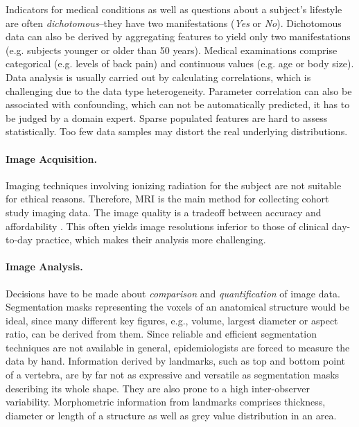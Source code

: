 \documentclass[journal]{style/vgtc} 			          %
\newcommand{\rem}[1]{\textcolor{red}{\sout{#1}}}
\begin{document}
Indicators for medical conditions as well as questions about a subject's lifestyle are often \emph{dichotomous}--they have two manifestations (\emph{Yes} or \emph{No}).
%
Dichotomous data can also be derived by aggregating features to yield only two manifestations (e.g. subjects younger or older than 50 years).
%
Medical examinations comprise categorical (e.g. levels of back pain) and continuous values (e.g. age or body size).
%
Data analysis is usually carried out by calculating correlations,
which is challenging due to the data type heterogeneity.
%
Parameter correlation can also be associated with confounding, which can not be automatically predicted, it has to be judged by a domain expert.
%
Sparse populated features are hard to assess statistically.
%
Too few data samples may distort the real underlying distributions.

\paragraph{Image Acquisition.} Imaging techniques involving ionizing radiation for the subject are not suitable for ethical reasons.
%
Therefore, MRI is the main method for collecting cohort study imaging data.
%
The image quality is a tradeoff between accuracy and affordability \cite{Preim2014}.
%
This often yields image resolutions inferior to those of clinical day-to-day practice, which makes their analysis more challenging.
%

\paragraph{Image Analysis.}
%
Decisions have to be made about \emph{comparison} and \emph{quantification} of image data.
%
Segmentation masks representing the voxels of an anatomical structure would be ideal, since many different key figures, e.g., volume, largest diameter or aspect ratio, can be derived from them.
%
Since reliable and efficient segmentation techniques are not available in general, epidemiologists are forced to measure the data by hand. %
%
Information derived by landmarks, such as top and bottom point of a vertebra, are by far not as expressive and versatile as segmentation masks describing its whole shape.
%
They are also prone to a high inter-observer variability.
%
%
Morphometric information from landmarks comprises thickness, diameter or length of a structure as well as grey value distribution in an area. %
\end{document}
